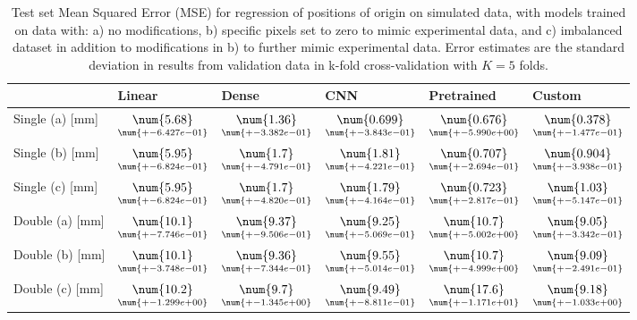 \begin{table}
\centering
\caption{
Test set Mean Squared Error (MSE) for regression of positions of origin on simulated data, with models trained on data with: 
a) no modifications, b) specific pixels set to zero to mimic experimental data, and c) imbalanced dataset
in addition to modifications in b) to further mimic experimental data. Error estimates are the standard deviation 
in results from validation data in k-fold cross-validation with $K=5$ folds.
}
\label{tab:regression-simulated-all-positions-mse}
\begin{tabular}{llllll}
\toprule
{} &                                             Linear &                                              Dense &                                                 CNN &                                          Pretrained &                                              Custom \\
\midrule
Single (a) [mm] &  $\underset{\num{+- 6.427e-01 }  }{\num{ 5.68 } }$ &  $\underset{\num{+- 3.382e-01 }  }{\num{ 1.36 } }$ &  $\underset{\num{+- 3.843e-01 }  }{\num{ 0.699 } }$ &  $\underset{\num{+- 5.990e+00 }  }{\num{ 0.676 } }$ &  $\underset{\num{+- 1.477e-01 }  }{\num{ 0.378 } }$ \\
Single (b) [mm] &  $\underset{\num{+- 6.824e-01 }  }{\num{ 5.95 } }$ &  $\underset{\num{+- 4.791e-01 }  }{\num{ 1.7 } }$ &  $\underset{\num{+- 4.221e-01 }  }{\num{ 1.81 } }$ &  $\underset{\num{+- 2.694e-01 }  }{\num{ 0.707 } }$ &  $\underset{\num{+- 3.938e-01 }  }{\num{ 0.904 } }$ \\
Single (c) [mm] &  $\underset{\num{+- 6.824e-01 }  }{\num{ 5.95 } }$ &  $\underset{\num{+- 4.820e-01 }  }{\num{ 1.7 } }$ &  $\underset{\num{+- 4.164e-01 }  }{\num{ 1.79 } }$ &  $\underset{\num{+- 2.817e-01 }  }{\num{ 0.723 } }$ &  $\underset{\num{+- 5.147e-01 }  }{\num{ 1.03 } }$ \\
Double (a) [mm] &  $\underset{\num{+- 7.746e-01 }  }{\num{ 10.1 } }$ &  $\underset{\num{+- 9.506e-01 }  }{\num{ 9.37 } }$ &  $\underset{\num{+- 5.069e-01 }  }{\num{ 9.25 } }$ &  $\underset{\num{+- 5.002e+00 }  }{\num{ 10.7 } }$ &  $\underset{\num{+- 3.342e-01 }  }{\num{ 9.05 } }$ \\
Double (b) [mm] &  $\underset{\num{+- 3.748e-01 }  }{\num{ 10.1 } }$ &  $\underset{\num{+- 7.344e-01 }  }{\num{ 9.36 } }$ &  $\underset{\num{+- 5.014e-01 }  }{\num{ 9.55 } }$ &  $\underset{\num{+- 4.999e+00 }  }{\num{ 10.7 } }$ &  $\underset{\num{+- 2.491e-01 }  }{\num{ 9.09 } }$ \\
Double (c) [mm] &  $\underset{\num{+- 1.299e+00 }  }{\num{ 10.2 } }$ &  $\underset{\num{+- 1.345e+00 }  }{\num{ 9.7 } }$ &  $\underset{\num{+- 8.811e-01 }  }{\num{ 9.49 } }$ &  $\underset{\num{+- 1.171e+01 }  }{\num{ 17.6 } }$ &  $\underset{\num{+- 1.033e+00 }  }{\num{ 9.18 } }$ \\
\bottomrule
\end{tabular}
\end{table}
